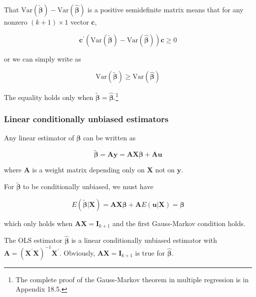\documentclass[a4paper,11pt]{article}
\newcommand{\var}{\mathrm{Var}}
\begin{document}
That \(\var(\tilde{\boldsymbol{\beta}}) -
\var(\hat{\boldsymbol{\beta}})\) is a positive semidefinite matrix
means that for any nonzero \((k+1) \times 1\) vector \(\mathbf{c}\),
\begin{LaTeX}
\[ \mathbf{c}^{\prime}\left(\var(\tilde{\boldsymbol{\beta}}) -
\var(\hat{\boldsymbol{\beta}})\right) \mathbf{c} \geq 0 \]
\end{LaTeX}
or we can simply write as
\begin{LaTeX}
\[ \var(\tilde{\boldsymbol{\beta}}) \geq
\var(\hat{\boldsymbol{\beta}})  \]
\end{LaTeX}
The equality holds only when \(\tilde{\boldsymbol{\beta}} =
\hat{\boldsymbol{\beta}}\).\footnote{The complete proof of the Gauss-Markov
theorem in multiple regression is in Appendix 18.5.}

\subsubsection*{Linear conditionally unbiased estimators}
\label{sec:org6374922}
Any linear estimator of \(\boldsymbol{\beta}\) can be written as
\begin{LaTeX}
\[ \tilde{\boldsymbol{\beta}} = \mathbf{Ay} = \mathbf{AX}\boldsymbol{\beta} + \mathbf{Au} \]
\end{LaTeX}
where \(\mathbf{A}\) is a weight matrix depending only on \(\mathbf{X}\)
not on \(\mathbf{y}\).

For \(\tilde{\boldsymbol{\beta}}\) to be conditionally unbiased, we must
have
\begin{LaTeX}
\begin{equation*}
E(\tilde{\boldsymbol{\beta}} | \mathbf{X}) = \mathbf{AX} \boldsymbol{\beta} + \mathbf{A} E(\mathbf{u} | \mathbf{X}) = \boldsymbol{\beta}
\end{equation*}
\end{LaTeX}
which only holds when \(\mathbf{AX} = \mathbf{I}_{k+1}\) and the first
Gauss-Markov condition holds.

The OLS estimator \(\hat{\boldsymbol{\beta}}\) is a linear conditionally
unbiased estimator with \(\mathbf{A} = \left(\mathbf{X}^{\prime}
\mathbf{X}\right)^{-1} \mathbf{X}^{\prime}\). Obviously, \(\mathbf{AX} =
\mathbf{I}_{k+1}\) is true for \(\hat{\boldsymbol{\beta}}\).
\end{document}

